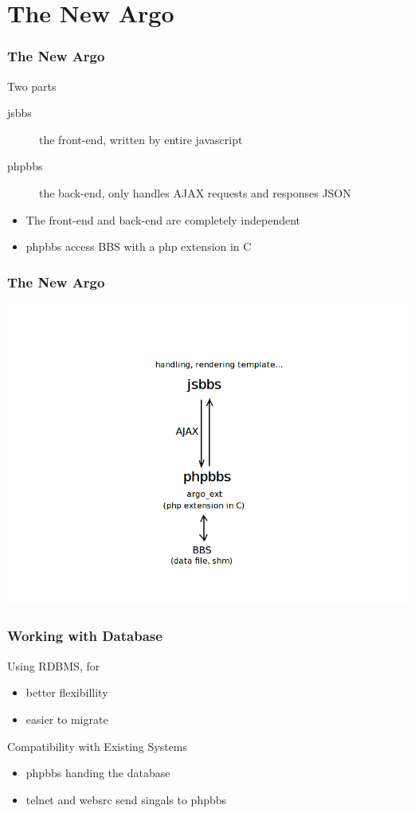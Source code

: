 \documentclass[slidestop,compress,mathserif]{beamer}
\begin{document}
  \section{The New Argo}
  \begin{frame}
    \frametitle{The New Argo}
    \begin{block}{Two parts}
      \begin{description}
        \item[jsbbs] the front-end, written by entire javascript
        \item[phpbbs] the back-end, only handles AJAX requests and responses JSON
      \end{description}
    \end{block}
    \begin{itemize}
      \item The front-end and back-end are completely independent
      \item phpbbs access BBS with a php extension in C
    \end{itemize}
  \end{frame}
  \begin{frame}
    \frametitle{The New Argo}
    \includegraphics[scale=0.35]{newargo.png}
  \end{frame}

  \begin{frame}
    \frametitle{Working with Database}
    \pause
    \begin{block}{Using RDBMS, for}
      \begin{itemize}
        \item better flexibillity
        \item easier to migrate
      \end{itemize}
    \end{block}
    \pause
    \begin{block}{Compatibility with Existing Systems}
      \begin{itemize}
        \item phpbbs handing the database
        \item telnet and websrc send singals to phpbbs
      \end{itemize}
    \end{block}
  \end{frame}
\end{document}
